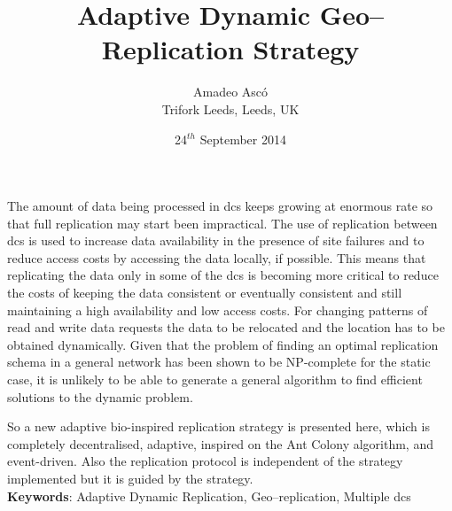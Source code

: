 \documentclass[english]{article}
\begin{document}
\title{Adaptive Dynamic Geo--Replication Strategy}

\author{Amadeo Asc\'{o}\\ Trifork Leeds, Leeds, UK}

\date{24$^{th}$ September 2014}

\maketitle

\abstract
The amount of data being processed in \glspl{dc} keeps growing at enormous rate so that full replication may start been impractical. The use of replication between \glspl{dc} is used to increase data availability in the presence of site failures and to reduce access costs by accessing the data locally, if possible. This means that replicating the data only in some of the \glspl{dc} is becoming more critical to reduce the costs of keeping the data consistent or eventually consistent and still maintaining a high availability and low access costs. For changing patterns of read and write data requests the data to be relocated and the location has to be obtained dynamically. Given that the problem of finding an optimal replication schema in a general network has been shown to be NP-complete for the static case, it is unlikely to be able to generate a general algorithm to find efficient solutions to the dynamic problem.

So a new adaptive bio-inspired replication strategy is presented here, which is completely decentralised, adaptive, inspired on the Ant Colony algorithm, and event-driven. Also the replication protocol is independent of the strategy implemented but it is guided by the strategy.\\

{\bf Keywords}: Adaptive Dynamic Replication, Geo--replication, Multiple \glspl{dc}
\end{document}
